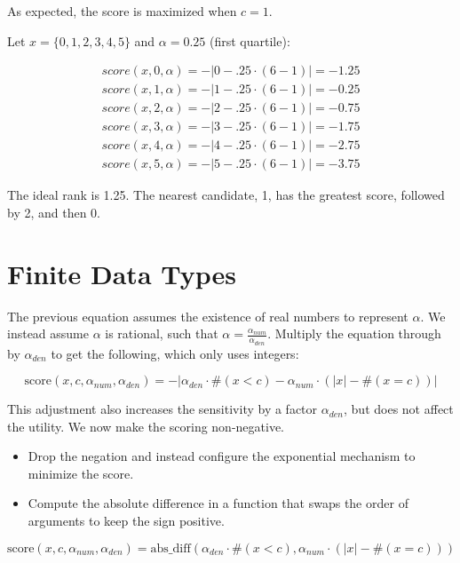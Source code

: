 \documentclass{article}
\begin{document}
As expected, the score is maximized when $c = 1$.

Let $x = \{0,1,2,3,4,5\}$ and $\alpha = 0.25$ (first quartile):

\begin{align*}
    score(x, 0, \alpha) = -|0 - .25 \cdot (6 - 1)| = -1.25 \\
    score(x, 1, \alpha) = -|1 - .25 \cdot (6 - 1)| = -0.25 \\
    score(x, 2, \alpha) = -|2 - .25 \cdot (6 - 1)| = -0.75 \\
    score(x, 3, \alpha) = -|3 - .25 \cdot (6 - 1)| = -1.75 \\
    score(x, 4, \alpha) = -|4 - .25 \cdot (6 - 1)| = -2.75 \\
    score(x, 5, \alpha) = -|5 - .25 \cdot (6 - 1)| = -3.75
\end{align*}

The ideal rank is 1.25. The nearest candidate, 1, has the greatest score, followed by 2, and then 0.


\section{Finite Data Types}
The previous equation assumes the existence of real numbers to represent $\alpha$.
We instead assume $\alpha$ is rational, such that $\alpha = \frac{\alpha_{num}}{\alpha_{den}}$.
Multiply the equation through by $\alpha_{den}$ to get the following,
which only uses integers:

\begin{equation}
    \textrm{score}(x, c, \alpha_{num}, \alpha_{den}) = -|\alpha_{den} \cdot \#(x < c) - \alpha_{num} \cdot (|x| - \#(x = c))|
\end{equation}

This adjustment also increases the sensitivity by a factor $\alpha_{den}$,
but does not affect the utility.
We now make the scoring non-negative.
\begin{itemize}
    \item Drop the negation and instead configure the exponential mechanism to minimize the score.
    \item Compute the absolute difference in a function that swaps the order of arguments to keep the sign positive.
\end{itemize}

\begin{equation}
    \textrm{score}(x, c, \alpha_{num}, \alpha_{den}) = \mathrm{abs\_diff}(\alpha_{den} \cdot \#(x < c), \alpha_{num} \cdot (|x| - \#(x = c)))
\end{equation}
\end{document}
